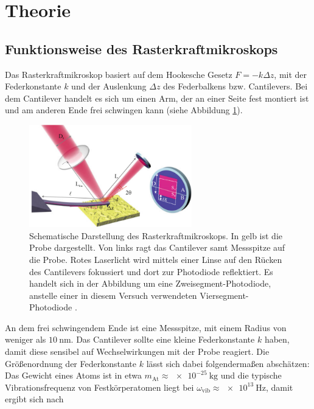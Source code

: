 \section{Theorie}
\label{sec:Theorie}

\subsection{Funktionsweise des Rasterkraftmikroskops}
\label{sec:Rasterkraftmikroskop}

Das Rasterkraftmikroskop basiert auf dem Hookesche Gesetz $F= -k\Delta z$, mit
der Federkonstante $k$ und der Auslenkung $\Delta z$ des Federbalkens bzw. Cantilevers.
Bei dem Cantilever handelt es sich um einen Arm, der an einer Seite fest montiert
ist und am anderen Ende frei schwingen kann (siehe Abbildung \ref{fig:AFM}).

\begin{figure}[H]
	\centering
	\includegraphics[width=0.63\textwidth]{Abb/AFM.png}
	\caption{Schematische Darstellung des Rasterkraftmikroskops. In gelb ist die
  Probe dargestellt. Von links ragt das Cantilever samt Messspitze auf die Probe.
  Rotes Laserlicht wird mittels einer Linse auf den Rücken des Cantilevers
  fokussiert und dort zur Photodiode reflektiert. Es handelt sich in der Abbildung
  um eine Zweisegment-Photodiode, anstelle einer in diesem Versuch verwendeten
  Viersegment-Photodiode \cite[161]{AFM}.}
	\label{fig:AFM}
\end{figure}

\noindent
An dem frei schwingendem Ende ist eine Messspitze, mit einem Radius von weniger
als $\SI{10}{\nano\meter}$. Das Cantilever sollte eine kleine Federkonstante $k$ haben,
damit diese sensibel auf Wechselwirkungen mit der Probe reagiert. Die Größenordnung
der Federkonstante $k$ lässt sich dabei folgendermaßen abschätzen: Das Gewicht
eines Atoms ist in etwa $m_{\text{At}} \approx \SI{e-25}{\kilo\gram}$ und
die typische Vibrationsfrequenz von Festkörperatomen liegt bei $\omega_{\text{vib}}
\approx\SI{e13}{\hertz}$, damit ergibt sich nach

